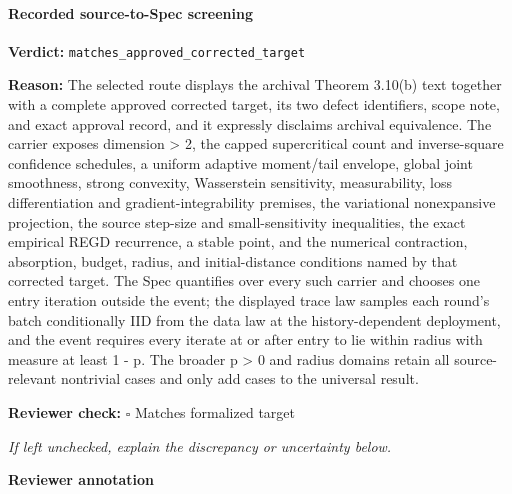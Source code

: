 \documentclass[10pt]{article}
\newcommand{\reviewerbox}{%
  \par\noindent\fbox{\parbox{0.96\linewidth}{\rule{0pt}{0.38in}}}\par
}
\newcommand{\reviewmatch}[1]{%
  \par\noindent\textbf{Reviewer check:} $\square$\; #1\par
  \noindent\emph{If left unchecked, explain the discrepancy or uncertainty below.}\par
}
\begin{document}
\paragraph{Recorded source-to-Spec screening}
\textbf{Verdict:} \texttt{matches\_approved\_corrected\_target}
\\
{\raggedright
\textbf{Reason:} The selected route displays the archival Theorem 3.\allowbreak{}10(b) text together with a complete approved corrected target, its two defect identifiers, scope note, and exact approval record, and it expressly disclaims archival equivalence.\allowbreak{} The carrier exposes dimension > 2, the capped supercritical count and inverse-\allowbreak{}square confidence schedules, a uniform adaptive moment/\allowbreak{}tail envelope, global joint smoothness, strong convexity, Wasserstein sensitivity, measurability, loss differentiation and gradient-\allowbreak{}integrability premises, the variational nonexpansive projection, the source step-\allowbreak{}size and small-\allowbreak{}sensitivity inequalities, the exact empirical REGD recurrence, a stable point, and the numerical contraction, absorption, budget, radius, and initial-\allowbreak{}distance conditions named by that corrected target.\allowbreak{} The Spec quantifies over every such carrier and chooses one entry iteration outside the event;\allowbreak{} the displayed trace law samples each round's batch conditionally IID from the data law at the history-\allowbreak{}dependent deployment, and the event requires every iterate at or after entry to lie within radius with measure at least 1 -\allowbreak{} p.\allowbreak{} The broader p > 0 and radius domains retain all source-\allowbreak{}relevant nontrivial cases and only add cases to the universal result.\allowbreak{}
\par}
\reviewmatch{Matches formalized target}
\noindent\textbf{Reviewer annotation}\par
\reviewerbox
\end{document}
